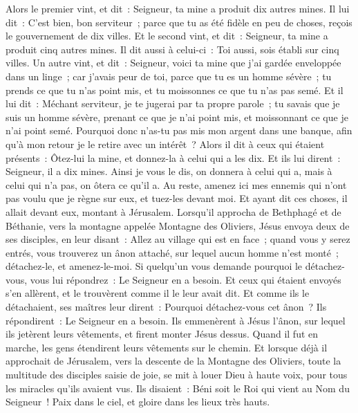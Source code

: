 \begin{multicols}{2}
Alors le premier vint, et dit~: Seigneur, ta mine a produit dix autres mines.
Il lui dit~: C'est bien, bon serviteur~; parce que tu as été fidèle en peu de choses, reçois le gouvernement de dix villes.
Et le second vint, et dit~: Seigneur, ta mine a produit cinq autres mines.
Il dit aussi à celui-ci~: Toi aussi, sois établi sur cinq villes.
Un autre vint, et dit~: Seigneur, voici ta mine que j'ai gardée enveloppée dans un linge~;
car j'avais peur de toi, parce que tu es un homme sévère~; tu prends ce que tu n'as point mis, et tu moissonnes ce que tu n'as pas semé.
Et il lui dit~: Méchant serviteur, je te jugerai par ta propre parole~; tu savais que je suis un homme sévère, prenant ce que je n'ai point mis, et moissonnant ce que je n'ai point semé.
Pourquoi donc n'as-tu pas mis mon argent dans une banque, afin qu'à mon retour je le retire avec un intérêt~?
Alors il dit à ceux qui étaient présents~: Ôtez-lui la mine, et donnez-la à celui qui a les dix.
Et ils lui dirent~: Seigneur, il a dix mines.
Ainsi je vous le dis, on donnera à celui qui a, mais à celui qui n'a pas, on ôtera ce qu'il a.
Au reste, amenez ici mes ennemis qui n'ont pas voulu que je règne sur eux, et tuez-les devant moi.
Et ayant dit ces choses, il allait devant eux, montant à Jérusalem.
Lorsqu'il approcha de Bethphagé et de Béthanie, vers la montagne appelée Montagne des Oliviers, Jésus envoya deux de ses disciples,
en leur disant~: Allez au village qui est en face~; quand vous y serez entrés, vous trouverez un ânon attaché, sur lequel aucun homme n'est monté~; détachez-le, et amenez-le-moi.
Si quelqu'un vous demande pourquoi le détachez-vous, vous lui répondrez~: Le Seigneur en a besoin.
Et ceux qui étaient envoyés s'en allèrent, et le trouvèrent comme il le leur avait dit.
Et comme ils le détachaient, ses maîtres leur dirent~: Pourquoi détachez-vous cet ânon~?
Ils répondirent~: Le Seigneur en a besoin.
Ils emmenèrent à Jésus l'ânon, sur lequel ils jetèrent leurs vêtements, et firent monter Jésus dessus.
Quand il fut en marche, les gens étendirent leurs vêtements sur le chemin.
Et lorsque déjà il approchait de Jérusalem, vers la descente de la Montagne des Oliviers, toute la multitude des disciples saisie de joie, se mit à louer Dieu à haute voix, pour tous les miracles qu'ils avaient vus.
Ils disaient~: Béni soit le Roi qui vient au Nom du Seigneur~! Paix dans le ciel, et gloire dans les lieux très hauts.

\end{multicols}

